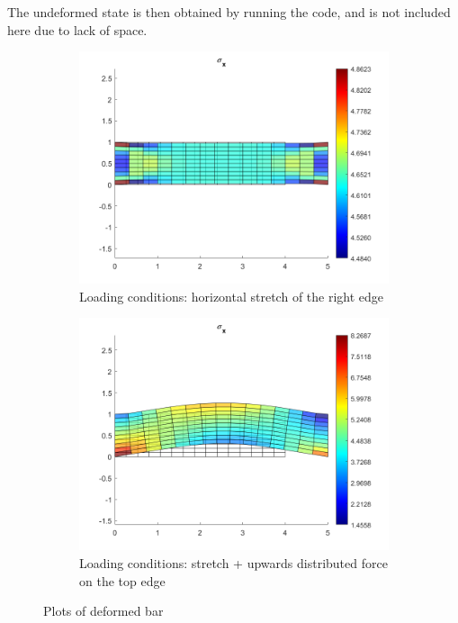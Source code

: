 \documentclass[hidelinks]{article}
\begin{document}
The undeformed state is then obtained by running the code, and is not included here due to lack of space.
%
\begin{figure}[h]
    \centering
    \begin{subfigure}[t]{0.49\textwidth}
        \centering
        \includegraphics[width=1\textwidth]{Report/stretch.png}
        \caption{Loading conditions: horizontal stretch of the right edge}
        \label{fig:stretch}
    \end{subfigure}
    \hfill
    \begin{subfigure}[t]{0.49\textwidth}
        \centering
        \includegraphics[width=1\textwidth]{Report/bending.png}
        \caption{Loading conditions: stretch + upwards distributed force on the top edge}
        \label{fig:bending}
    \end{subfigure}
    \caption{Plots of deformed bar}
    \label{fig:functionPlots}
\end{figure}
%
\end{document}
